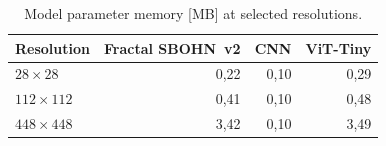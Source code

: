 \begin{table}[htbp]
\centering
\caption{Model parameter memory [MB] at selected resolutions.}
\label{tab:sota_mem}
\begin{tabular}{|l|r|r|r|}
\hline
\textbf{Resolution} & \textbf{Fractal SBOHN~v2} & \textbf{CNN} & \textbf{ViT-Tiny} \\
\hline
$28\times28$ & 0,22 & 0,10 & 0,29 \\
\hline
$112\times112$ & 0,41 & 0,10 & 0,48 \\
\hline
$448\times448$ & 3,42 & 0,10 & 3,49 \\
\hline
\end{tabular}
\end{table}
